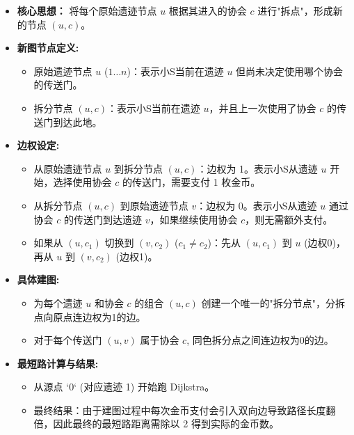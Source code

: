 \documentclass[11pt]{beamer}
\begin{document}
\begin{frame}
    \begin{itemize}
        \item \textbf{核心思想：} 将每个原始遗迹节点 $u$ 根据其进入的协会 $c$ 进行"拆点"，形成新的节点 $(u, c)$。
        \item \textbf{新图节点定义:}
        \begin{itemize}
            \item 原始遗迹节点 $u$ ($1 \dots n$)：表示小S当前在遗迹 $u$ 但尚未决定使用哪个协会的传送门。
            \item 拆分节点 $(u, c)$：表示小S当前在遗迹 $u$，并且上一次使用了协会 $c$ 的传送门到达此地。
        \end{itemize}
    \end{itemize}
\end{frame}

\begin{frame}
    \begin{itemize}
        \item \textbf{边权设定:}
        \begin{itemize}
            \item 从原始遗迹节点 $u$ 到拆分节点 $(u, c)$：边权为 1。表示小S从遗迹 $u$ 开始，选择使用协会 $c$ 的传送门，需要支付 1 枚金币。
            \item 从拆分节点 $(u, c)$ 到原始遗迹节点 $v$：边权为 0。表示小S从遗迹 $u$ 通过协会 $c$ 的传送门到达遗迹 $v$，如果继续使用协会 $c$，则无需额外支付。
            \item 如果从 $(u, c_1)$ 切换到 $(v, c_2)$ ($c_1 \ne c_2$)：先从 $(u, c_1)$ 到 $u$ (边权0)，再从 $u$ 到 $(v, c_2)$ (边权1)。
        \end{itemize}
    \end{itemize}
\end{frame}

\begin{frame}
    \begin{itemize}
        \item \textbf{具体建图:}
        \begin{itemize}
            \item 为每个遗迹 $u$ 和协会 $c$ 的组合 $(u, c)$ 创建一个唯一的"拆分节点"，分拆点向原点连边权为1的边。
            \item 对于每个传送门 $(u, v)$ 属于协会 $c$, 同色拆分点之间连边权为0的边。 
        \end{itemize}
        \item \textbf{最短路计算与结果:}
        \begin{itemize}
            \item 从源点 `0` (对应遗迹 1) 开始跑 Dijkstra。
            \item 最终结果：由于建图过程中每次金币支付会引入双向边导致路径长度翻倍，因此最终的最短路距离需除以 2 得到实际的金币数。
        \end{itemize}
    \end{itemize}
\end{frame}
\end{document}
